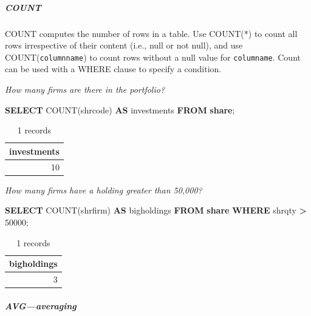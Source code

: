 \documentclass[
]{article}
\newenvironment{Shaded}{\begin{snugshade}}{\end{snugshade}}
\newcommand{\DecValTok}[1]{\textcolor[rgb]{0.00,0.00,0.81}{#1}}
\newcommand{\FunctionTok}[1]{\textcolor[rgb]{0.00,0.00,0.00}{#1}}
\newcommand{\KeywordTok}[1]{\textcolor[rgb]{0.13,0.29,0.53}{\textbf{#1}}}
\newcommand{\NormalTok}[1]{#1}
\newcommand{\OperatorTok}[1]{\textcolor[rgb]{0.81,0.36,0.00}{\textbf{#1}}}
\begin{document}
\hypertarget{count}{%
\subparagraph*{COUNT}\label{count}}

COUNT computes the number of rows in a table. Use COUNT(*) to count all rows irrespective of their content (i.e., null or not null), and use COUNT(\texttt{columnname}) to count rows without a null value for \texttt{columname}. Count can be used with a WHERE clause to specify a condition.

\emph{How many firms are there in the portfolio?}

\begin{Shaded}
\begin{Highlighting}[]
\KeywordTok{SELECT} \FunctionTok{COUNT}\NormalTok{(shrcode) }\KeywordTok{AS}\NormalTok{ investments }\KeywordTok{FROM} \KeywordTok{share}\NormalTok{;}
\end{Highlighting}
\end{Shaded}

\begin{table}

\caption{\label{tab:unnamed-chunk-21}1 records}
\centering
\begin{tabular}[t]{r}
\hline
investments\\
\hline
10\\
\hline
\end{tabular}
\end{table}

\emph{How many firms have a holding greater than 50,000?}

\begin{Shaded}
\begin{Highlighting}[]
\KeywordTok{SELECT} \FunctionTok{COUNT}\NormalTok{(shrfirm) }\KeywordTok{AS}\NormalTok{ bigholdings }\KeywordTok{FROM} \KeywordTok{share} \KeywordTok{WHERE}\NormalTok{ shrqty }\OperatorTok{\textgreater{}} \DecValTok{50000}\NormalTok{;}
\end{Highlighting}
\end{Shaded}

\begin{table}

\caption{\label{tab:unnamed-chunk-22}1 records}
\centering
\begin{tabular}[t]{r}
\hline
bigholdings\\
\hline
3\\
\hline
\end{tabular}
\end{table}

\hypertarget{avgaveraging}{%
\subparagraph*{AVG---averaging}\label{avgaveraging}}
\end{document}
